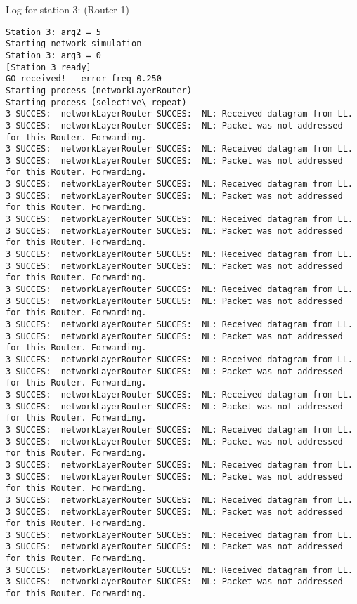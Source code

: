 Log for station 3: (Router 1)
\begin{lstlisting}[breaklines=true]
Station 3: arg2 = 5
Starting network simulation
Station 3: arg3 = 0
[Station 3 ready]
GO received! - error freq 0.250
Starting process (networkLayerRouter)
Starting process (selective\_repeat)
3 SUCCES:  networkLayerRouter SUCCES:  NL: Received datagram from LL.
3 SUCCES:  networkLayerRouter SUCCES:  NL: Packet was not addressed for this Router. Forwarding.
3 SUCCES:  networkLayerRouter SUCCES:  NL: Received datagram from LL.
3 SUCCES:  networkLayerRouter SUCCES:  NL: Packet was not addressed for this Router. Forwarding.
3 SUCCES:  networkLayerRouter SUCCES:  NL: Received datagram from LL.
3 SUCCES:  networkLayerRouter SUCCES:  NL: Packet was not addressed for this Router. Forwarding.
3 SUCCES:  networkLayerRouter SUCCES:  NL: Received datagram from LL.
3 SUCCES:  networkLayerRouter SUCCES:  NL: Packet was not addressed for this Router. Forwarding.
3 SUCCES:  networkLayerRouter SUCCES:  NL: Received datagram from LL.
3 SUCCES:  networkLayerRouter SUCCES:  NL: Packet was not addressed for this Router. Forwarding.
3 SUCCES:  networkLayerRouter SUCCES:  NL: Received datagram from LL.
3 SUCCES:  networkLayerRouter SUCCES:  NL: Packet was not addressed for this Router. Forwarding.
3 SUCCES:  networkLayerRouter SUCCES:  NL: Received datagram from LL.
3 SUCCES:  networkLayerRouter SUCCES:  NL: Packet was not addressed for this Router. Forwarding.
3 SUCCES:  networkLayerRouter SUCCES:  NL: Received datagram from LL.
3 SUCCES:  networkLayerRouter SUCCES:  NL: Packet was not addressed for this Router. Forwarding.
3 SUCCES:  networkLayerRouter SUCCES:  NL: Received datagram from LL.
3 SUCCES:  networkLayerRouter SUCCES:  NL: Packet was not addressed for this Router. Forwarding.
3 SUCCES:  networkLayerRouter SUCCES:  NL: Received datagram from LL.
3 SUCCES:  networkLayerRouter SUCCES:  NL: Packet was not addressed for this Router. Forwarding.
3 SUCCES:  networkLayerRouter SUCCES:  NL: Received datagram from LL.
3 SUCCES:  networkLayerRouter SUCCES:  NL: Packet was not addressed for this Router. Forwarding.
3 SUCCES:  networkLayerRouter SUCCES:  NL: Received datagram from LL.
3 SUCCES:  networkLayerRouter SUCCES:  NL: Packet was not addressed for this Router. Forwarding.
3 SUCCES:  networkLayerRouter SUCCES:  NL: Received datagram from LL.
3 SUCCES:  networkLayerRouter SUCCES:  NL: Packet was not addressed for this Router. Forwarding.
3 SUCCES:  networkLayerRouter SUCCES:  NL: Received datagram from LL.
3 SUCCES:  networkLayerRouter SUCCES:  NL: Packet was not addressed for this Router. Forwarding.

\end{lstlisting}

